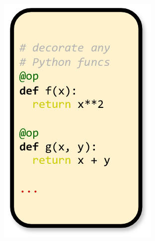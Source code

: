 \documentclass{article} %
\begin{document}
\begin{figure}[h]
\centering
\begin{subfigure}{0.23\textwidth}
\centering
\includegraphics[width=\textwidth]{img/fig1.jpg}
\end{subfigure}
\begin{subfigure}{0.35\textwidth}
\centering

\end{subfigure}
\end{figure}
\end{document}
